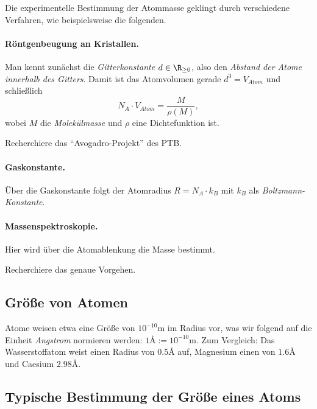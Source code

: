\documentclass{subfiles}
\begin{document}
        Die experimentelle Bestimmung der Atommasse geklingt durch verschiedene Verfahren, wie beispielsweise die folgenden.
        
        \paragraph*{Röntgenbeugung an Kristallen.} Man kennt zunächst die \emph{Gitterkonstante} $d\in\R_{\geq 0}$, also den \emph{Abstand der Atome innerhalb des Gitters}. Damit ist das Atomvolumen gerade $d^3=V_{\textit{Atom}}$ und schließlich
        \[
            N_A\cdot V_{\textit{Atom}}=\frac{M}{\rho(M)},
        \]
        wobei $M$ die \emph{Molekülmasse} und $\rho$ eine Dichtefunktion ist. 
        \begin{Aufgabe}
            \nr{} Recherchiere das \enquote{Avogadro-Projekt} des PTB.
        \end{Aufgabe}

        \paragraph*{Gaskonstante.} Über die Gaskonstante folgt der Atomradius $R=N_A\cdot k_B$ mit $k_B$ als \emph{Boltzmann-Konstante}. 

        \paragraph*{Massenspektroskopie.} Hier wird über die Atomablenkung die Masse bestimmt.
        \begin{Aufgabe}
            \nr{} Recherchiere das genaue Vorgehen. 
        \end{Aufgabe}

        \subsection{Größe von Atomen}
            Atome weisen etwa eine Größe von $10^{-10}\si\metre$ im Radius vor, was wir folgend auf die Einheit \emph{Angstrom} normieren werden: $1\si\angstrom:=10^{-10}\si\metre$. Zum Vergleich: Das Wasserstoffatom weist einen Radius von $0.5\si\angstrom$ auf, Magnesium einen von $1.6\si\angstrom$ und Caesium $2.98\si\angstrom$. 

        \subsection{Typische Bestimmung der Größe eines Atoms}
\end{document}
